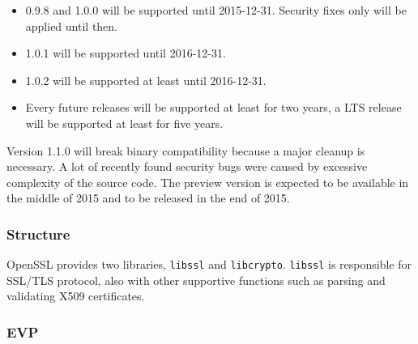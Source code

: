 \begin{itemize}
  \item 0.9.8 and 1.0.0 will be supported until 2015-12-31. Security fixes only will be applied until then.
  \item 1.0.1 will be supported until 2016-12-31.
  \item 1.0.2 will be supported at least until 2016-12-31.
  \item Every future releases will be supported at least for two years, a LTS release will be supported at least for five years.
\end{itemize}

Version 1.1.0 will break binary compatibility because a major cleanup is necessary. A lot of recently found security bugs were caused by excessive complexity of the source code. The preview version is expected to be available in the middle of 2015 and to be released in the end of 2015.

\subsubsection{Structure}


OpenSSL provides two libraries, \texttt{libssl} and \texttt{libcrypto}. \texttt{libssl} is responsible for SSL/TLS protocol, also with other supportive functions such as parsing and validating X509 certificates.

\subsubsection{EVP}
